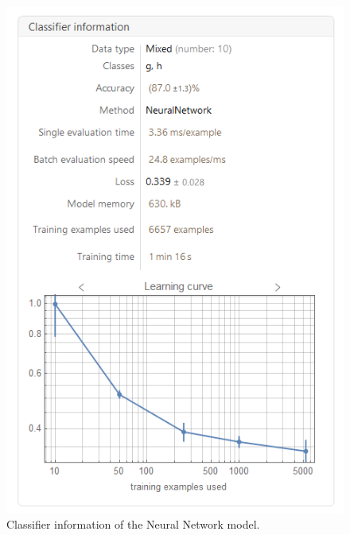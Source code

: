 \documentclass[a4paper, 12pt]{report}
\theoremstyle{definition}
\begin{document}
\begin{figure}[p]
  \centering
  \includegraphics[scale=0.75]{models/nn1.png}
  \caption{Classifier information of the Neural Network model.}
\end{figure}
\end{document}
